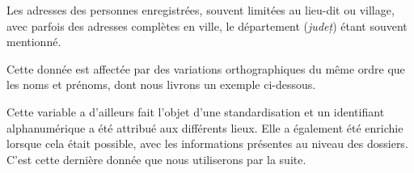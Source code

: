 \documentclass[a4paper,12pt,twoside]{book}
\begin{document}
                Les adresses des personnes enregistrées, souvent limitées au lieu-dit ou village, avec parfois des adresses complètes en ville, le département (\textit{județ}) étant souvent mentionné.
                
                Cette donnée est affectée par des variations orthographiques du même ordre que les noms et prénoms, dont nous livrons un exemple ci-dessous.
                
                Cette variable a d'ailleurs fait l'objet d'une standardisation et un identifiant alphanumérique a été attribué aux différents lieux. Elle a également été enrichie lorsque cela était possible, avec les informations présentes au niveau des dossiers. C'est cette dernière donnée que nous utiliserons par la suite.
                
                \pagebreak
                
\end{document}

